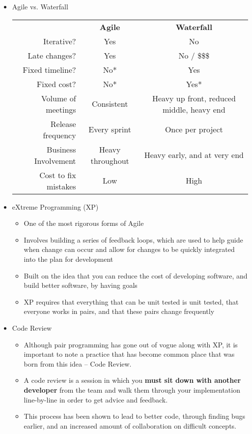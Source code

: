 \documentclass[11pt]{article}
\begin{document}
\begin{itemize}
		\item Agile vs. Waterfall\\
			\begin{tabular}{| r c c |}
				\hline
				 & \textbf{Agile} & \textbf{Waterfall}\\
				 Iterative? & \cellcolor{green!25}Yes & \cellcolor{green!15}No\\
				 Late changes? & \cellcolor{green!25}Yes & \cellcolor{green!15}No / \$\$\$\\
				 Fixed timeline? & \cellcolor{green!15}No* & \cellcolor{green!25}Yes\\
				 Fixed cost? & \cellcolor{green!15}No* & \cellcolor{green!25}Yes*\\
				 Volume of meetings & \cellcolor{green!25}Consistent & Heavy up front, reduced middle, heavy end\\
				 Release frequency & \cellcolor{green!25}Every sprint & \cellcolor{green!15}Once per project\\
				 Business Involvement & Heavy throughout & Heavy early, and at very end\\
				 Cost to fix mistakes & \cellcolor{green!25}Low & \cellcolor{green!15}High\\
				 \hline
			\end{tabular}

		\item eXtreme Programming (XP)
			\begin{itemize}
				\item One of the most rigorous forms of Agile
				\item Involves building a series of feedback loops, which are used to help guide when change can occur and allow for changes to be quickly integrated into the plan for development
				\item Built on the idea that you can reduce the cost of developing software, and build better software, by having goals
				\item XP requires that everything that can be unit tested is unit tested, that everyone works in pairs, and that these pairs change frequently
			\end{itemize}

		\item Code Review
			\begin{itemize}
				\item Although pair programming has gone out of vogue along with XP, it is important to note a practice that has become common place that was born from this idea -- Code Review.
				\item A code review is a session in which you \textbf{must sit down with another developer} from the team and walk them through your implementation line-by-line in order to get advice and feedback.
				\item This process has been shown to lead to better code, through finding bugs earlier, and an increased amount of collaboration on difficult concepts.
			\end{itemize}


\end{itemize}
\end{document}
